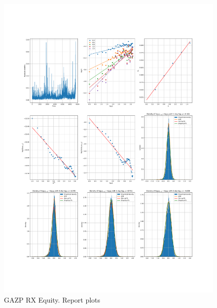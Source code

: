     \begin{figure}[h]
        \centering
        \includegraphics[width=\textwidth]{fig/GAZP RX Equity.pdf}
        \caption{GAZP RX Equity. Report plots}
    \end{figure} 
        
